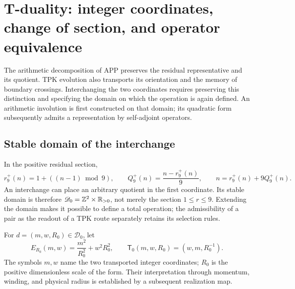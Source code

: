 \section{T-duality: integer coordinates, change of section, and operator equivalence}
\label{iv:dualidad}

The arithmetic decomposition of APP preserves the residual representative
and its quotient. TPK evolution also transports its orientation and
the memory of boundary crossings. Interchanging the two
coordinates requires preserving this distinction and specifying the domain
on which the operation is again defined. An arithmetic involution is
first constructed on that domain; its quadratic form
subsequently admits a representation by self-adjoint operators.

\subsection{Stable domain of the interchange}

In the positive residual section,
\begin{equation}
 r_9^+(n)=1+((n-1)\bmod9),\qquad
 Q_9^+(n)=\frac{n-r_9^+(n)}9,
 \qquad n=r_9^+(n)+9Q_9^+(n).
 \label{iv:eq:division-positiva}
\end{equation}
An interchange can place an arbitrary quotient in the first
coordinate. Its stable domain is therefore
\(\mathscr D_0=\mathbb Z^2\times\mathbb R_{>0}\), not merely the section
\(1\leq r\leq9\). Extending the domain makes it possible to define
a total operation; the admissibility of a pair as the readout of
a TPK route separately retains its selection rules.

\begin{definition}
\label{iv:def:dualidad}
For \(d=(m,w,R_0)\in\mathscr D_0\), let
\begin{equation}
 E_{R_0}(m,w)=\frac{m^2}{R_0^2}+w^2R_0^2,
 \qquad
 \mathsf T_0(m,w,R_0)=(w,m,R_0^{-1}).
 \label{iv:eq:energia-t}
\end{equation}
The symbols \(m,w\) name the two transported integer
coordinates; \(R_0\) is the positive dimensionless scale of
the form. Their interpretation through momentum, winding, and
physical radius is established by a subsequent realization map.
\end{definition}

